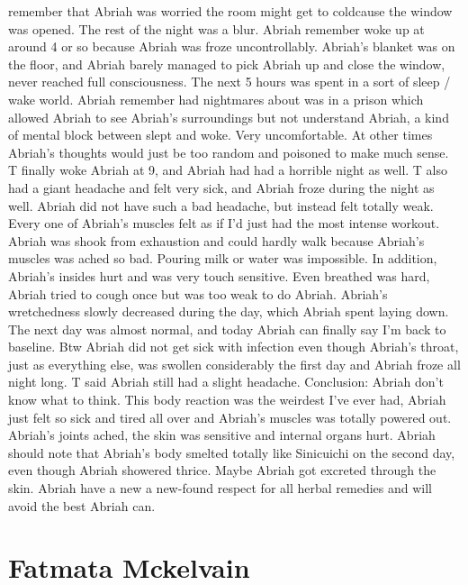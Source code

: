 \documentclass[12pt]{book}
\begin{document}
remember that Abriah was worried the room might get to coldcause the window was opened. The rest of the night was a blur. Abriah remember woke up at around 4 or so because Abriah was froze uncontrollably. Abriah's blanket was on the floor, and Abriah barely managed to pick Abriah up and close the window, never reached full consciousness. The next 5 hours was spent in a sort of sleep / wake world. Abriah remember had nightmares about was in a prison which allowed Abriah to see Abriah's surroundings but not understand Abriah, a kind of mental block between slept and woke. Very uncomfortable. At other times Abriah's thoughts would just be too random and poisoned to make much sense. T finally woke Abriah at 9, and Abriah had had a horrible night as well. T also had a giant headache and felt very sick, and Abriah froze during the night as well. Abriah did not have such a bad headache, but instead felt totally weak. Every one of Abriah's muscles felt as if I'd just had the most intense workout. Abriah was shook from exhaustion and could hardly walk because Abriah's muscles was ached so bad. Pouring milk or water was impossible. In addition, Abriah's insides hurt and was very touch sensitive. Even breathed was hard, Abriah tried to cough once but was too weak to do Abriah. Abriah's wretchedness slowly decreased during the day, which Abriah spent laying down. The next day was almost normal, and today Abriah can finally say I'm back to baseline. Btw Abriah did not get sick with infection even though Abriah's throat, just as everything else, was swollen considerably the first day and Abriah froze all night long. T said Abriah still had a slight headache. Conclusion: Abriah don't know what to think. This body reaction was the weirdest I've ever had, Abriah just felt so sick and tired all over and Abriah's muscles was totally powered out. Abriah's joints ached, the skin was sensitive and internal organs hurt. Abriah should note that Abriah's body smelted totally like Sinicuichi on the second day, even though Abriah showered thrice. Maybe Abriah got excreted through the skin. Abriah have a new a new-found respect for all herbal remedies and will avoid the best Abriah can.



\chapter{Fatmata Mckelvain}
\end{document}
